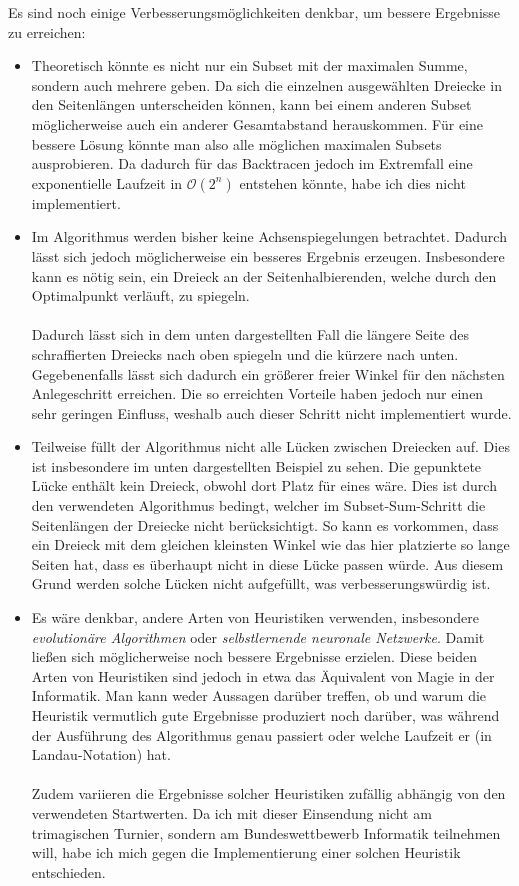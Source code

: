 \documentclass[a4paper, notitlepage, 12pt]{scrartcl}
\begin{document}
  Es sind noch einige Verbesserungsmöglichkeiten denkbar, um bessere Ergebnisse zu erreichen:
  \begin{itemize}
  	\item Theoretisch könnte es nicht nur ein Subset mit der maximalen Summe, sondern auch mehrere geben. Da sich die einzelnen ausgewählten Dreiecke in den Seitenlängen unterscheiden können, kann bei einem anderen Subset möglicherweise auch ein anderer Gesamtabstand herauskommen. Für eine bessere Lösung könnte man also alle möglichen maximalen Subsets ausprobieren. Da dadurch für das Backtracen jedoch im Extremfall eine exponentielle Laufzeit in $\mathcal{O}(2^n)$ entstehen könnte, habe ich dies nicht implementiert.
  	\item Im Algorithmus werden bisher keine Achsenspiegelungen betrachtet. Dadurch lässt sich jedoch möglicherweise ein besseres Ergebnis erzeugen. Insbesondere kann es nötig sein, ein Dreieck an der Seitenhalbierenden, welche durch den Optimalpunkt verläuft, zu spiegeln. \\ \\ Dadurch lässt sich in dem unten dargestellten Fall die längere Seite des schraffierten Dreiecks nach oben spiegeln und die kürzere nach unten. Gegebenenfalls lässt sich dadurch ein größerer freier Winkel für den nächsten Anlegeschritt erreichen. Die so erreichten Vorteile haben jedoch nur einen sehr geringen Einfluss, weshalb auch dieser Schritt nicht implementiert wurde.
  	\item Teilweise füllt der Algorithmus nicht alle Lücken zwischen Dreiecken auf. Dies ist insbesondere im unten dargestellten Beispiel zu sehen. Die gepunktete Lücke enthält kein Dreieck, obwohl dort Platz für eines wäre. Dies ist durch den verwendeten Algorithmus bedingt, welcher im Subset-Sum-Schritt die Seitenlängen der Dreiecke nicht berücksichtigt. So kann es vorkommen, dass ein Dreieck mit dem gleichen kleinsten Winkel wie das hier platzierte so lange Seiten hat, dass es überhaupt nicht in diese Lücke passen würde. Aus diesem Grund werden solche Lücken nicht aufgefüllt, was verbesserungswürdig ist.
  	\item Es wäre denkbar, andere Arten von Heuristiken verwenden, insbesondere \textit{evolutionäre Algorithmen} oder \textit{selbstlernende neuronale Netzwerke}. Damit ließen sich möglicherweise noch bessere Ergebnisse erzielen. Diese beiden Arten von Heuristiken sind jedoch in etwa das Äquivalent von Magie in der Informatik. Man kann weder Aussagen darüber treffen, ob und warum die Heuristik vermutlich gute Ergebnisse produziert noch darüber, was während der Ausführung des Algorithmus genau passiert oder welche Laufzeit er (in Landau-Notation) hat. \\ \\
  	Zudem variieren die Ergebnisse solcher Heuristiken zufällig abhängig von den verwendeten Startwerten. Da ich mit dieser Einsendung nicht am trimagischen Turnier, sondern am Bundeswettbewerb Informatik teilnehmen will, habe ich mich gegen die Implementierung einer solchen Heuristik entschieden.
  \end{itemize}
\end{document}
